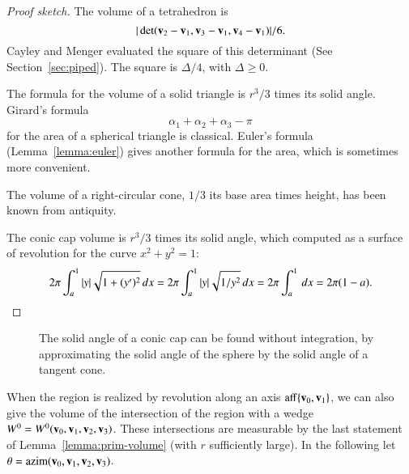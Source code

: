 \begin{proof}[Proof sketch]
The volume of a tetrahedron is
\[ 
|\det({\mathbf v}_2-{\mathbf v}_1,{\mathbf v}_3-{\mathbf v}_1,{\mathbf v}_4-{\mathbf v}_1)|/6.
\] 
Cayley and Menger evaluated the square of this determinant (See
Section~\ref{sec:piped}).  The square is $\Delta/4$, with
$\Delta\ge0$.  
%

The formula for the volume of a solid triangle is $r^3/3$ times
its solid angle.  Girard's formula
\begin{equation} 
\alpha_1+\alpha_2+\alpha_3-\pi\label{eqn:girard}
\end{equation}
for the area of a spherical triangle is classical.  Euler's formula
(Lemma~\ref{lemma:euler}) gives another formula for the area, which is
sometimes more convenient.
%
%
%

The volume of a right-circular cone, $1/3$ its base area times height,
has been known from antiquity.  

The conic cap volume is $r^3/3$ times its solid angle, which computed as a
 surface of revolution for the curve $x^2 + y^2 = 1$:
\[ 
2\pi \int_a^1  |y| \sqrt{1 + (y')^2}\,dx 
= 2\pi\int_a^1  |y| \sqrt{1/y^2}\,dx 
= 2\pi \int_a^1\,dx = 2\pi (1-a).\qedhere
\]
\end{proof}

\begin{figure}[htb]
\centering
{}
\caption{The solid angle of a conic cap can be found without integration, by approximating
the solid angle of the sphere by the solid angle of a tangent cone.}
\label{fig:dart}
\end{figure}





%

When the region is realized by revolution along an axis
${\operatorname{aff}}\{{\mathbf v}_0,{\mathbf v}_1\}$, we can also give the volume of the
intersection of the region with a wedge
$W^0=W^0({\mathbf v}_0,{\mathbf v}_1,{\mathbf v}_2,{\mathbf v}_3)$.  These intersections are measurable by
the last statement of Lemma~\ref{lemma:prim-volume} (with $r$
sufficiently large).  In the following let $\theta =
{\operatorname{azim}}({\mathbf v}_0,{\mathbf v}_1,{\mathbf v}_2,{\mathbf v}_3)$.  %
%

